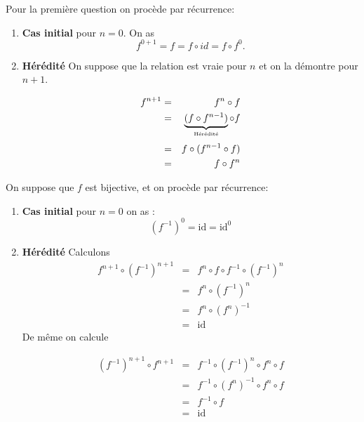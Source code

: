 \documentclass{report}
\begin{document}
\begin{myproof}
 Pour la première question on procède par récurrence: 
 \begin{enumerate}
   \item \textbf{Cas initial} pour $n=0$. On as 
     $$
     f^{0+1} = f = f \circ id = f\circ f^{0}.
     $$
   \item \textbf{Hérédité} On suppose que la relation est vraie pour $n$ et on
     la démontre pour $n+1$.

     \begin{eqnarray}
       f^{n+1} &=& f^n\circ f\\
               & =& \underbrace{(f \circ f^{n-1})}_{\text{\tiny Hérédité}} \circ
               f\\[3pt]
               &=& f \circ (f^{n-1} \circ f)\\
               &=& f \circ f^n 
     \end{eqnarray}
 \end{enumerate}
 On suppose que $f$ est bijective,  et on procède par récurrence:

 \begin{enumerate}
   \item \textbf{Cas initial} pour $n = 0$ on as :
     $$
     \left(f^{-1}\right)^0 =  \text{id} = \text{id}^0
     $$
   \item \textbf{Hérédité}
     Calculons
     \begin{eqnarray}
       f^{n+1} \circ (f^{-1})^{n+1} &=& f^n \circ f \circ f^{-1} \circ
       (f^{-1})^n\\
                                    &=& f^n\circ (f^{-1})^n\\
                                    &=& f^n \circ (f^n)^{-1}\\
                                    &=& \text{id}
     \end{eqnarray}
    De même on calcule 

     \begin{eqnarray}
       (f^{-1})^{n+1} \circ f^{n+1} &=&  f^{-1}\circ (f^{-1})^n \circ f^n \circ
       f\\
                                    &=&f^{-1}\circ (f^{n})^{-1} \circ f^n \circ
       f\\
                                    &=& f^{-1}\circ f\\
                                    &=& \text{id}
     \end{eqnarray}
 \end{enumerate}

\end{myproof}
\end{document}
